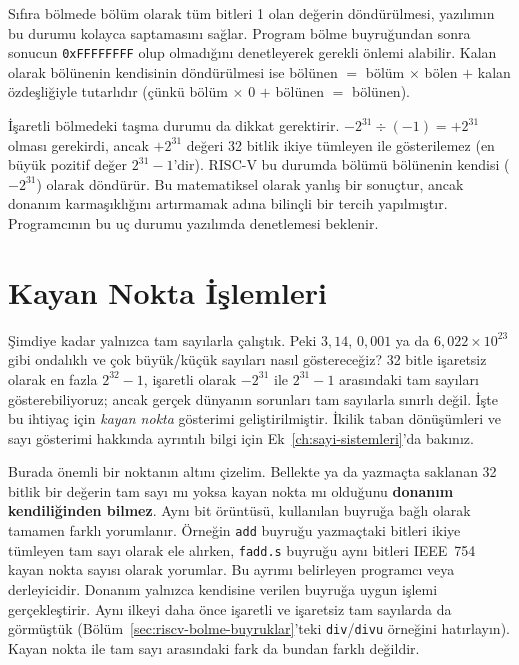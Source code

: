 Sıfıra bölmede bölüm olarak tüm bitleri 1 olan değerin döndürülmesi, yazılımın bu durumu kolayca saptamasını sağlar. Program bölme buyruğundan sonra sonucun \texttt{0xFFFFFFFF} olup olmadığını denetleyerek gerekli önlemi alabilir. Kalan olarak bölünenin kendisinin döndürülmesi ise bölünen $=$ bölüm $\times$ bölen $+$ kalan özdeşliğiyle tutarlıdır (çünkü bölüm $\times$ 0 $+$ bölünen $=$ bölünen).

İşaretli bölmedeki taşma durumu da dikkat gerektirir. $-2^{31} \div (-1) = +2^{31}$ olması gerekirdi, ancak $+2^{31}$ değeri 32 bitlik ikiye tümleyen ile gösterilemez (en büyük pozitif değer $2^{31}-1$'dir). RISC-V bu durumda bölümü bölünenin kendisi ($-2^{31}$) olarak döndürür. Bu matematiksel olarak yanlış bir sonuçtur, ancak donanım karmaşıklığını artırmamak adına bilinçli bir tercih yapılmıştır. Programcının bu uç durumu yazılımda denetlemesi beklenir.


\section{Kayan Nokta İşlemleri}
\label{sec:kayan-nokta}

Şimdiye kadar yalnızca tam sayılarla çalıştık. Peki $3{,}14$, $0{,}001$ ya da $6{,}022 \times 10^{23}$ gibi ondalıklı ve çok büyük/küçük sayıları nasıl göstereceğiz? 32 bitle işaretsiz olarak en fazla $2^{32}-1$, işaretli olarak $-2^{31}$ ile $2^{31}-1$ arasındaki tam sayıları gösterebiliyoruz; ancak gerçek dünyanın sorunları tam sayılarla sınırlı değil. İşte bu ihtiyaç için \emph{kayan nokta} gösterimi geliştirilmiştir. İkilik taban dönüşümleri ve sayı gösterimi hakkında ayrıntılı bilgi için Ek~\ref{ch:sayi-sistemleri}'da bakınız.

Burada önemli bir noktanın altını çizelim. Bellekte ya da yazmaçta saklanan 32 bitlik bir değerin tam sayı mı yoksa kayan nokta mı olduğunu \textbf{donanım kendiliğinden bilmez}. Aynı bit örüntüsü, kullanılan buyruğa bağlı olarak tamamen farklı yorumlanır. Örneğin \texttt{add} buyruğu yazmaçtaki bitleri ikiye tümleyen tam sayı olarak ele alırken, \texttt{fadd.s} buyruğu aynı bitleri IEEE~754 kayan nokta sayısı olarak yorumlar. Bu ayrımı belirleyen programcı veya derleyicidir. Donanım yalnızca kendisine verilen buyruğa uygun işlemi gerçekleştirir. Aynı ilkeyi daha önce işaretli ve işaretsiz tam sayılarda da görmüştük (Bölüm~\ref{sec:riscv-bolme-buyruklar}'teki \texttt{div}/\texttt{divu} örneğini hatırlayın). Kayan nokta ile tam sayı arasındaki fark da bundan farklı değildir.

